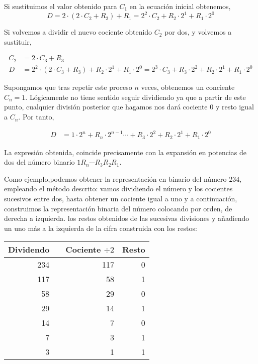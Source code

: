 Si sustituimos el valor obtenido para $C_1$ en la ecuación inicial obtenemos,   
\begin{equation*}
D=2\cdot(2\cdot C_2+R_2)+R_1= 2^2\cdot C_2+R_2\cdot 2^1+R_1\cdot 2^0 
\end{equation*}

Si volvemos a dividir el nuevo cociente obtenido $C_2$ por dos, y volvemos a sustituir,

 \begin{align*}
C_2&=2\cdot C_3+R_3 \\
D&=2^2\cdot(2\cdot C_3+R_3)+R_2\cdot 2^1+R_1\cdot 2^0=2^3\cdot C_3+R_3\cdot 2^2 +R_2\cdot 2^1+R_1\cdot 2^0
\end{align*}

Supongamos que tras repetir este proceso $n$ veces, obtenemos un conciente $C_n=1$. Lógicamente no tiene sentido seguir dividiendo ya que a partir de este punto, cualquier división posterior que hagamos nos dará cociente $0$ y resto igual a $C_n$. Por tanto, 

 \begin{align*}
D&=1\cdot 2^n+R_n\cdot 2^{n-1}\cdots +R_3\cdot 2^2 +R_2\cdot 2^1+R_1\cdot 2^0
\end{align*}

La expresión obtenida, coincide precisamente con la expansión en potencias de dos del número binario $1R_n \cdots R_3R_2R_1$.


Como ejemplo,podemos obtener la representación en binario del número $234$, empleando el método descrito: vamos dividiendo el número y los cocientes sucesivos entre dos, hasta obtener un cociente igual a uno y a continuación, construimos la representación binaria del número colocando por orden, de derecha a izquierda.  los restos  obtenidos de las sucesivas divisiones y añadiendo un uno más a la izquierda de la cifra construida con los restos:

\begin{table}[h]
\begin{tabular}{|r|r|r|r|}
Dividendo& &Cociente $\div 2$&Resto\\
\hline
234& &117&0\\
117& &58&1\\
58& &29&0\\
29& &14&1\\
14& &7&0\\
7& &3&1\\
3& &1&1
\end{tabular}
\end{table}
 
